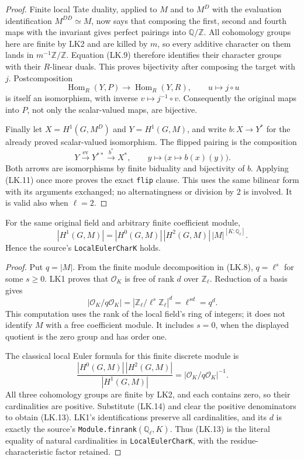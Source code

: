 \begin{proof}
Finite local Tate duality, applied to $M$ and to $M^D$ with the
evaluation identification $M^{DD}\simeq M$, now says that composing
the first, second and fourth maps with the invariant gives perfect
pairings into $\mathbb Q/\mathbb Z$.  All cohomology groups here
are finite by LK2 and are killed by $m$, so every additive character
on them lands in $m^{-1}\mathbb Z/\mathbb Z$.  Equation (LK.9)
therefore identifies their character groups with their $R$-linear
duals.  This proves bijectivity after composing the target with $j$.
Postcomposition
\[
 \operatorname{Hom}_R(Y,P)\longrightarrow\operatorname{Hom}_R(Y,R),
 \qquad u\longmapsto j\circ u
 \tag{LK.11}
\]
is itself an isomorphism, with inverse $v\mapsto j^{-1}\circ v$.
Consequently the original maps into $P$, not only the scalar-valued
maps, are bijective.

Finally let $X=H^1(G,M^D)$ and $Y=H^1(G,M)$, and write
$b:X\to Y^*$ for the already proved scalar-valued isomorphism.
The flipped pairing is the composition
\[
 Y\xrightarrow{\ \mathrm{ev}\ }Y^{**}
   \xrightarrow{\ b^*\ }X^*,
 \qquad y\longmapsto\bigl(x\longmapsto b(x)(y)\bigr).
 \tag{LK.12}
\]
Both arrows are isomorphisms by finite biduality and bijectivity of
$b$.  Applying (LK.11) once more proves the exact \texttt{flip}
clause.  This uses the same bilinear form with its arguments exchanged;
no alternatingness or division by $2$ is involved.  It is valid also
when $\ell=2$.
\end{proof}

\begin{proposition}
\label{prop:lk-euler}
For the same original field and arbitrary finite coefficient module,
\[
 |H^1(G,M)|=|H^0(G,M)|\,|H^2(G,M)|\,|M|^{[K:\mathbb Q_\ell]}.
 \tag{LK.13}
\]
Hence the source's \texttt{LocalEulerCharK} holds.
\end{proposition}

\begin{proof}
Put $q=|M|$.  From the finite module decomposition in (LK.8),
$q=\ell^s$ for some $s\ge0$.  LK1 proves that $\mathcal O_K$ is
free of rank $d$ over $\mathbb Z_\ell$.  Reduction of a basis gives
\[
 |\mathcal O_K/q\mathcal O_K|
   =|\mathbb Z_\ell/\ell^s\mathbb Z_\ell|^d
   =\ell^{sd}=q^d.
 \tag{LK.14}
\]
This computation uses the rank of the local field's ring of
integers; it does not identify $M$ with a free coefficient module.
It includes $s=0$, when the displayed quotient is the zero group
and has order one.

The classical local Euler formula for this finite discrete module is
\[
 \frac{|H^0(G,M)|\,|H^2(G,M)|}{|H^1(G,M)|}
     =|\mathcal O_K/q\mathcal O_K|^{-1}.
 \tag{LK.15}
\]
All three cohomology groups are finite by LK2, and each contains zero,
so their cardinalities are positive.  Substitute (LK.14) and clear
the positive denominators to obtain (LK.13).  LK1's identifications
preserve all cardinalities, and its $d$ is exactly the source's
\texttt{Module.finrank}$(\mathbb Q_\ell,K)$.  Thus (LK.13) is the
literal equality of natural cardinalities in \texttt{LocalEulerCharK},
with the residue-characteristic factor retained.
\end{proof}


